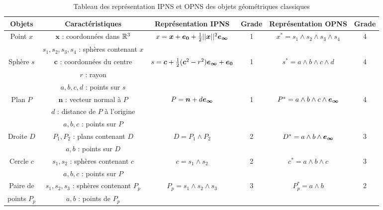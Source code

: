 \begin{table}[h!]
\begin{center}
\hspace*{-2.5cm} 
\begin{tabular}{|c|c|c|c|c|c|}
\hline

Objets & Caractéristiques & Représentation IPNS & Grade & Représentation OPNS & Grade \\\hline
Point $x$ & $\bm{x}$ : coordonnées dans  $\mathbb{R}^3$  & $x = \bm{x} + \bm{e_0} + \frac{1}{2}||\bm{x}||^2 \bm{e_{\infty}}$ & 1 & $x^* = s_1 \wedge s_2 \wedge s_3 \wedge s_4$ & 4 \\
& $s_1, s_2, s_3, s_4$ : sphères contenant $x$& & & &\\
\hline

Sphère $s$ &  $\bm{c}$ : coordonnées du centre  & $s = \bm{c} + \frac{1}{2}(\bm{c}^2-r^2)\bm{e_{\infty}} + \bm{e_{0}}$ & 1 & $s^* = a \wedge b \wedge c \wedge d$ & 4 \\
& $r$ : rayon & & & &\\
& $a, b, c, d$ : points sur $s$ & & & &\\\hline

Plan $P$ &  $\bm{n}$ : vecteur normal à $P$  & $P = \bm{n} + d\bm{e_{\infty}}$ & 1 & $P^* = a \wedge b \wedge c \wedge \bm{e_{\infty}}$ & 4 \\
& $d$ : distance de $P$ à l'origine & & & &\\
& $a, b, c$ : points sur $P$ & & & &\\\hline

Droite $D$  &  $P_1, P_2$ : plans contenant $D$  & $D = P_1 \wedge P_2$ & 2 & $D^* = a \wedge b \wedge \bm{e_{\infty}}$ & 3 \\
& $a, b$ : points sur $D$ & & & &\\\hline

Cercle $c$ &  $s_1, s_2$ : sphères contenant $c$  & $c = s_1 \wedge s_2$ & 2 & $c^* = a \wedge b \wedge c$ & 3 \\
& $a, b, c$ : points sur $P$ & & & &\\\hline

Paire de  &  $s_1, s_2, s_3$ : sphères contenant $P_p$  & $P_p = s_1 \wedge s_2 \wedge s_3 $ & 3 & $P_p^* = a \wedge b$ & 2 \\
points $P_p$ & $a, b$ : points de $P_p$ & & & &\\\hline
\end{tabular}
\end{center}
\caption{Tableau des représentation IPNS et OPNS des objets géométriques classiques}
\renewcommand{\thetable}{\arabic{table}}
\label{tableau}
\end{table}


